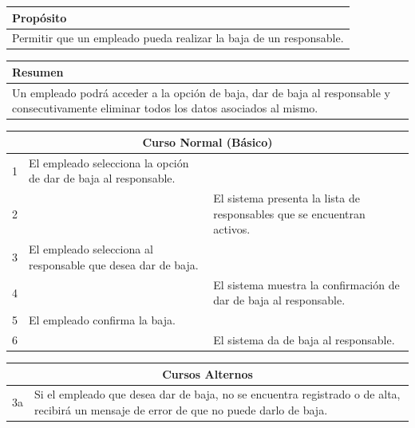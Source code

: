 \vspace{0.2cm}

\begin{table}[h!]
\centering
\begin{tabularx}{\textwidth}{|X|}
\hline
\cellcolor[HTML]{F2F2F2}\textbf{Propósito} \\ \hline
Permitir que un empleado pueda realizar la baja de un responsable. \\ \hline
\end{tabularx}
\end{table}

\vspace{0.2cm}

\begin{table}[h!]
\centering
\begin{tabularx}{\textwidth}{|X|}
\hline
\cellcolor[HTML]{F2F2F2}\textbf{Resumen} \\ \hline
Un empleado podrá acceder a la opción de baja, dar de baja al responsable y consecutivamente eliminar todos los datos asociados al mismo. \\ \hline
\end{tabularx}
\end{table}

\vspace{0.2cm}

\begin{table}[h!]
\centering
\begin{tabularx}{\textwidth}{|c|X|X|}
\hline
\multicolumn{3}{|c|}{\cellcolor[HTML]{F2F2F2}\textbf{Curso Normal (Básico)}} \\ \hline
1 & El empleado selecciona la opción de dar de baja al responsable. & \\ \hline
2 & & El sistema presenta la lista de responsables que se encuentran activos. \\ \hline
3 & El empleado selecciona al responsable que desea dar de baja. & \\ \hline
4 & & El sistema muestra la confirmación de dar de baja al responsable. \\ \hline
5 & El empleado confirma la baja. & \\ \hline
6 & & El sistema da de baja al responsable. \\ \hline
\end{tabularx}
\end{table}

\vspace{0.2cm}

\begin{table}[h!]
\centering
\begin{tabularx}{\textwidth}{|c|X|}
\hline
\multicolumn{2}{|c|}{\cellcolor[HTML]{F2F2F2}\textbf{Cursos Alternos}} \\ \hline
3a & Si el empleado que desea dar de baja, no se encuentra registrado o de alta, recibirá un mensaje de error de que no puede darlo de baja. \\ \hline
\end{tabularx}
\end{table}

